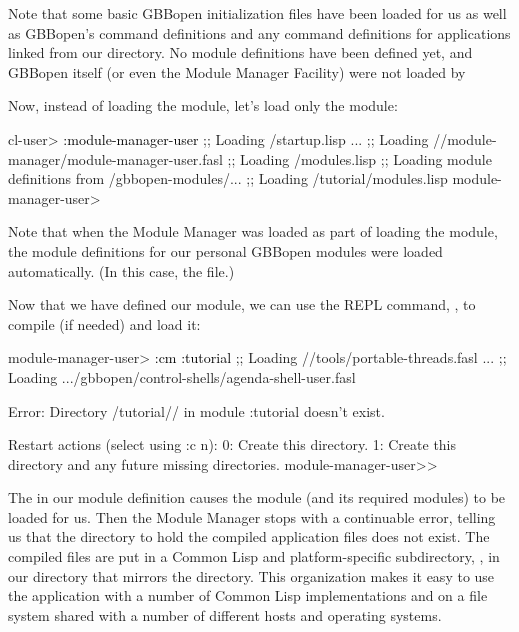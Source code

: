 \documentclass[10pt,twoside,english,pdftex]{article}
\begin{document}
Note that some basic GBBopen initialization files have been loaded for us as
well as GBBopen's command definitions and any command definitions for
applications linked from our 
directory. No module definitions have been defined yet, and GBBopen itself (or
even the Module Manager Facility) were not loaded by

Now, instead of loading the  module, let's
load only the  module:
%
\W\supp
\begin{smallexample}
\textcolor{darkergray}{%
  cl-user> \textcolor{black}{:module-manager-user}
  ;; Loading /startup.lisp
     ...
  ;;     Loading //module-manager/module-manager-user.fasl
  ;;   Loading /modules.lisp
  ;; Loading module definitions from /gbbopen-modules/...
  ;;     Loading /tutorial/modules.lisp
  module-manager-user>}
\end{smallexample}
%
Note that when the Module Manager was loaded as part of loading the
 module, the module definitions for our
personal GBBopen modules were loaded automatically.  (In this case, the
 file.)

%
%
Now that we have defined our  module, we can use the
 REPL command, , to compile (if
needed) and load it:
%
\W\supp
\begin{example}
\textcolor{darkergray}{%
  module-manager-user> \textcolor{black}{:cm :tutorial}
  ;;   Loading //tools/portable-threads.fasl
     ...
  ;;   Loading .../gbbopen/control-shells/agenda-shell-user.fasl

  Error: Directory /tutorial// 
         in module :tutorial doesn't exist.

  Restart actions (select using :c n):
    0: Create this directory.
    1: Create this directory and any future missing directories.
  module-manager-user>>}
\end{example}
%
The  in our  module definition causes the
 module (and its required modules) to be
loaded for us.  Then the Module Manager stops with a continuable error,
telling us that the directory to hold the compiled application files does not
exist.  The compiled files are put in a Common Lisp and platform-specific
subdirectory, , in our 
directory that mirrors the  directory.  This organization makes
it easy to use the application with a number of Common Lisp implementations
and on a file system shared with a number of different hosts and operating
systems.
\end{document}
